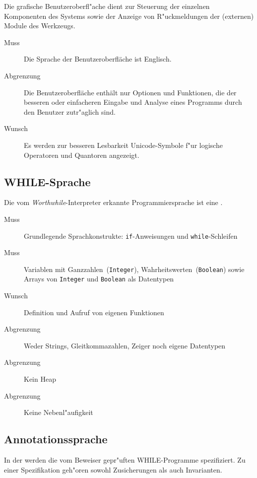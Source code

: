 Die grafische Benutzeroberfl"ache dient zur Steuerung der einzelnen Komponenten des Systems sowie der Anzeige von R"uckmeldungen der (externen) Module des Werkzeugs.%

\begin{description}%
    \item [Muss] Die Sprache der Benutzeroberfläche ist Englisch.%
    \item [Abgrenzung] Die Benutzeroberfläche enthält nur Optionen und Funktionen, die der besseren oder einfacheren Eingabe und Analyse eines Programms durch den Benutzer zutr"aglich sind.%
    \item [Wunsch] Es werden zur besseren Lesbarkeit Unicode-Symbole f"ur logische Operatoren und Quantoren angezeigt.%
\end{description}%

\subsection{WHILE-Sprache}%

Die vom \textit{Worthwhile}-Interpreter erkannte Programmiersprache ist eine .

\begin{description}%
    \item [Muss] Grundlegende Sprachkonstrukte: \texttt{if}-Anweisungen und \texttt{while}-Schleifen
    \item [Muss] Variablen mit Ganzzahlen~(\texttt{Integer}), Wahrheitswerten~(\texttt{Boolean}) sowie Arrays von \texttt{Integer} und \texttt{Boolean} als Datentypen%
    \item [Wunsch] Definition und Aufruf von eigenen Funktionen%
    \item [Abgrenzung] Weder Strings, Gleitkommazahlen, Zeiger noch eigene Datentypen%
    \item [Abgrenzung] Kein Heap%
    \item [Abgrenzung] Keine Nebenl"aufigkeit%
\end{description}%

\subsection{Annotationssprache}%

In der  werden die vom Beweiser gepr"uften WHILE-Programme spezifiziert. Zu einer Spezifikation geh"oren sowohl Zusicherungen als auch Invarianten.%

